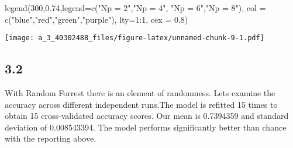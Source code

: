 \documentclass[
]{article}
\newenvironment{Shaded}{\begin{snugshade}}{\end{snugshade}}
\newcommand{\AttributeTok}[1]{\textcolor[rgb]{0.77,0.63,0.00}{#1}}
\newcommand{\DecValTok}[1]{\textcolor[rgb]{0.00,0.00,0.81}{#1}}
\newcommand{\FloatTok}[1]{\textcolor[rgb]{0.00,0.00,0.81}{#1}}
\newcommand{\FunctionTok}[1]{\textcolor[rgb]{0.00,0.00,0.00}{#1}}
\newcommand{\NormalTok}[1]{#1}
\newcommand{\SpecialCharTok}[1]{\textcolor[rgb]{0.00,0.00,0.00}{#1}}
\newcommand{\StringTok}[1]{\textcolor[rgb]{0.31,0.60,0.02}{#1}}
\begin{document}
\begin{Shaded}
\begin{Highlighting}[]
\FunctionTok{legend}\NormalTok{(}\DecValTok{300}\NormalTok{,}\FloatTok{0.74}\NormalTok{,}\AttributeTok{legend=}\FunctionTok{c}\NormalTok{(}\StringTok{"Np = 2"}\NormalTok{,}\StringTok{"Np = 4"}\NormalTok{, }\StringTok{"Np = 6"}\NormalTok{,}\StringTok{"Np = 8"}\NormalTok{), }\AttributeTok{col =} \FunctionTok{c}\NormalTok{(}\StringTok{"blue"}\NormalTok{,}\StringTok{"red"}\NormalTok{,}\StringTok{"green"}\NormalTok{,}\StringTok{"purple"}\NormalTok{), }\AttributeTok{lty=}\DecValTok{1}\SpecialCharTok{:}\DecValTok{1}\NormalTok{, }\AttributeTok{cex =} \FloatTok{0.8}\NormalTok{)}
\end{Highlighting}
\end{Shaded}

\texttt{[image: a\_3\_40302488\_files/figure-latex/unnamed-chunk-9-1.pdf]}

\hypertarget{section-7}{%
\subsection{3.2}\label{section-7}}

With Random Forrest there is an element of randomness. Lets examine the
accuracy across different independent runs.The model is refitted 15
times to obtain 15 cross-validated accuracy scores. Our mean is
0.7394359 and standard deviation of 0.008543394. The model performs
significantly better than chance with the reporting above.
\end{document}
